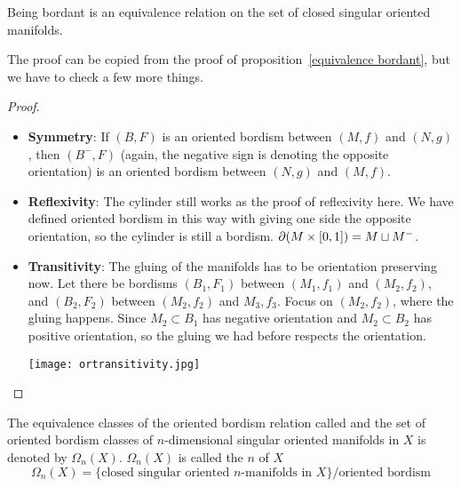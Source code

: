 \documentclass[a4paper,11pt]{article}
\begin{document}
\begin{proposition}\label{oriented eq. rel}
    Being bordant is an equivalence relation on the set of closed singular oriented manifolds.
\end{proposition}

The proof can be copied from the proof of proposition\ \ref{equivalence bordant}, but we have to check a few more things.

\begin{proof}
    \begin{itemize}
        \item \textbf{Symmetry}: If \((B,F)\) is an oriented bordism between \((M,f)\) and \((N,g)\), then \((B^-,F)\) (again, the negative sign is denoting the opposite orientation) is an oriented bordism between \((N,g)\) and \((M,f)\).
        \item \textbf{Reflexivity}: The cylinder still works as the proof of reflexivity here. We have defined oriented bordism in this way with giving one side the opposite orientation, so the cylinder is still a bordism. \(\partial(M\times [0,1])=M\sqcup M^-\).
        \item \textbf{Transitivity}: The gluing of the manifolds has to be orientation preserving now. Let there be bordisms \((B_1,F_1)\) between \((M_1,f_1)\) and \((M_2,f_2)\), and \((B_2,F_2)\) between \((M_2,f_2)\) and \(M_3,f_3\). Focus on \((M_2,f_2)\), where the gluing happens. Since \(M_2\subset B_1\) has negative orientation and \(M_2\subset B_2\) has positive orientation, so the gluing we had before respects the orientation.
        \begin{center}
        \texttt{[image: ortransitivity.jpg]}
        \end{center}
    \end{itemize}
\end{proof}

\begin{definition}
    The equivalence classes of the oriented bordism relation called  and the set of oriented bordism classes of \(n\)-dimensional singular oriented manifolds in \(X\) is denoted by \(\Omega_n(X)\). \(\Omega_n(X)\) is called the \(n\) of \(X\)
    \[\Omega_n(X)=\{\text{closed singular oriented \(n\)-manifolds in } X\}\big/\text{oriented bordism}\]
\end{definition}
\end{document}
